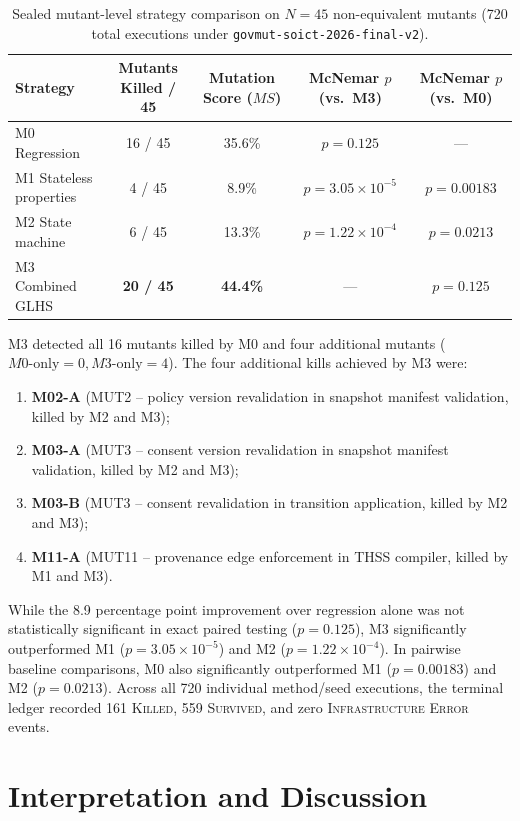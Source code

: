 \documentclass[runningheads]{llncs}
\begin{document}
\begin{table}[t]
\caption{Sealed mutant-level strategy comparison on $N = 45$ non-equivalent mutants (720 total executions under \texttt{govmut-soict-2026-final-v2}).}
\label{tab:res}
\centering\small
\begin{tabularx}{\textwidth}{p{}c c c c}
\toprule
Strategy & Mutants Killed / 45 & Mutation Score ($MS$) & McNemar $p$ (vs.\ M3) & McNemar $p$ (vs.\ M0) \\
\midrule
M0 Regression & 16 / 45 & 35.6\% & $p = 0.125$ & --- \\
M1 Stateless properties & 4 / 45 & 8.9\% & $p = 3.05 \times 10^{-5}$ & $p = 0.00183$ \\
M2 State machine & 6 / 45 & 13.3\% & $p = 1.22 \times 10^{-4}$ & $p = 0.0213$ \\
M3 Combined GLHS & \textbf{20 / 45} & \textbf{44.4\%} & --- & $p = 0.125$ \\
\bottomrule
\end{tabularx}
\end{table}

M3 detected all 16 mutants killed by M0 and four additional mutants ($M0\text{-only} = 0, M3\text{-only} = 4$). The four additional kills achieved by M3 were:
\begin{enumerate}
    \item \textbf{M02-A} (MUT2 -- policy version revalidation in snapshot manifest validation, killed by M2 and M3);
    \item \textbf{M03-A} (MUT3 -- consent version revalidation in snapshot manifest validation, killed by M2 and M3);
    \item \textbf{M03-B} (MUT3 -- consent revalidation in transition application, killed by M2 and M3);
    \item \textbf{M11-A} (MUT11 -- provenance edge enforcement in THSS compiler, killed by M1 and M3).
\end{enumerate}
While the 8.9 percentage point improvement over regression alone was not statistically significant in exact paired testing ($p = 0.125$), M3 significantly outperformed M1 ($p = 3.05 \times 10^{-5}$) and M2 ($p = 1.22 \times 10^{-4}$). In pairwise baseline comparisons, M0 also significantly outperformed M1 ($p = 0.00183$) and M2 ($p = 0.0213$). Across all 720 individual method/seed executions, the terminal ledger recorded 161 \textsc{Killed}, 559 \textsc{Survived}, and zero \textsc{Infrastructure Error} events.

\section{Interpretation and Discussion}
\end{document}
